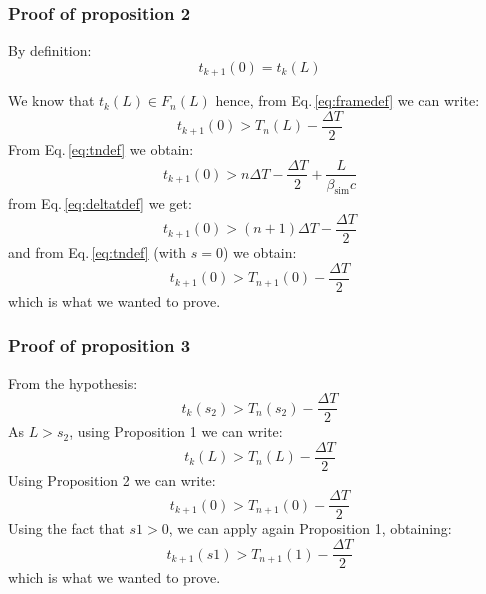 \subsubsection*{Proof of proposition 2}

By definition:
\begin{equation}
t_{k+1}(0) = t_{k}(L)
\end{equation}

We know that $t_{k}(L) \in F_n(L)$ hence, from Eq.\,\ref{eq:framedef} we can write:
\begin{equation}
t_{k+1}(0) > T_n(L) - \frac{\Delta T}{2}
\end{equation}
From Eq.\,\ref{eq:tndef} we obtain:
\begin{equation}
t_{k+1}(0) > n \Delta T - \frac{\Delta T}{2} + \frac{L}{\beta_\text{sim}c}
\end{equation}
from Eq.\,\ref{eq:deltatdef} we get:
\begin{equation}
t_{k+1}(0) > (n+1) \Delta T - \frac{\Delta T}{2}
\end{equation}
and from Eq.\,\ref{eq:tndef} (with $s=0$) we obtain:\begin{equation}
t_{k+1}(0) > T_{n+1}(0) - \frac{\Delta T}{2}
\end{equation}
which is what we wanted to prove.

\subsubsection*{Proof of proposition 3}

From the hypothesis:
\begin{equation}
t_{k}(s_2) > T_{n}(s_2) - \frac{\Delta T}{2}
\end{equation}
As $L>s_2$, using Proposition 1 we can write:
\begin{equation}
t_{k}(L) > T_{n}(L) - \frac{\Delta T}{2}
\end{equation}
Using Proposition 2 we can write:
\begin{equation}
t_{k+1}(0) > T_{n+1}(0) - \frac{\Delta T}{2}
\end{equation}
Using the fact that $s1>0$, we can apply again Proposition 1, obtaining:
\begin{equation}
t_{k+1}(s1) > T_{n+1}(1) - \frac{\Delta T}{2}
\end{equation}
which is what we wanted to prove.

